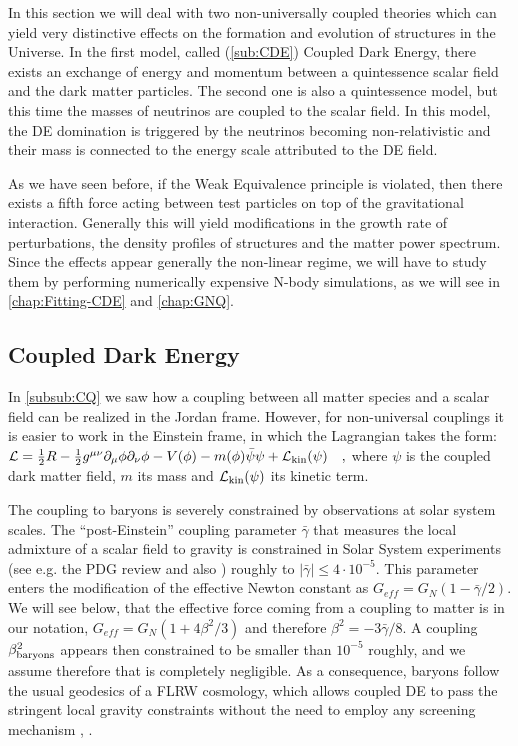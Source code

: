 In this section we will deal with two non-universally coupled theories which can yield very distinctive 
effects on the formation and evolution of structures in the Universe.
In the first model, called (\cref{sub:CDE}) Coupled Dark Energy, there exists an exchange of energy and momentum
between a quintessence scalar field and the dark matter particles. 
The second one is also a quintessence model, but this time the masses of neutrinos are 
coupled to the scalar field. In this model, the DE domination is triggered by the neutrinos becoming non-relativistic
and their mass is connected to the energy scale attributed to the DE field.

As we have seen before, if the Weak Equivalence principle is violated, then there exists a fifth force acting between test
particles on top of the gravitational interaction. Generally this will yield modifications in the growth rate of perturbations, 
the density profiles of structures and the matter power spectrum. Since the effects appear generally the non-linear regime,
we will have to study them by performing numerically expensive N-body simulations, as we will see in \cref{chap:Fitting-CDE}
and \cref{chap:GNQ}.


\subsection{Coupled Dark Energy \label{sub:CDE}}

In \cref{subsub:CQ} we saw how a coupling between all matter species and a scalar field can be realized in the Jordan frame.
However, for non-universal couplings it is easier to work in the Einstein frame, in which the Lagrangian takes the form:
\beeqalsp$\label{eq:CDE-Lagrangian}
\mathcal{L} = \frac{1}{2} R - \frac{1}{2} g^{\mu \nu}  \partial_{\mu}\phi \partial_{\nu}\phi 
- V(\phi) - m(\phi) \bar{\psi} \psi + \mathcal{L}_{\rm kin}(\psi) \quad,
$
where $\psi$ is the coupled dark matter field, $m$ its mass and $\mathcal{L}_{\rm kin}(\psi)$
its kinetic term.

The coupling to baryons is severely constrained by observations at solar system scales.
The ``post-Einstein'' coupling parameter $\bar{\gamma}$
that measures the local admixture of a scalar field to gravity is
constrained in Solar System experiments (see e.g. the PDG review \cite{Agashe:2014kda}
and also \citep{Will_2005,Bertotti_Iess_Tortora_2003}) roughly to
$|\bar{\gamma}|\le4\cdot10^{-5}$. This parameter enters the modification
of the effective Newton constant as $G_{eff}=G_{N}(1-\bar{\gamma}/2)$. 
We will see below, that the effective force coming from a coupling to matter is
in our notation, $G_{eff}=G_{N}(1+4\beta^{2}/3)$
and therefore $\beta^{2}=-3\bar{\gamma}/8$. A coupling $\beta_{\rm baryons}^{2}$
appears then constrained to be smaller than $10^{-5}$ roughly, and
we assume therefore that is completely negligible. As a consequence,
baryons follow the usual geodesics of a FLRW cosmology, which allows
coupled DE to pass the stringent local gravity constraints without
the need to employ any screening mechanism \citep{2015arXiv150203888H}, 
.

